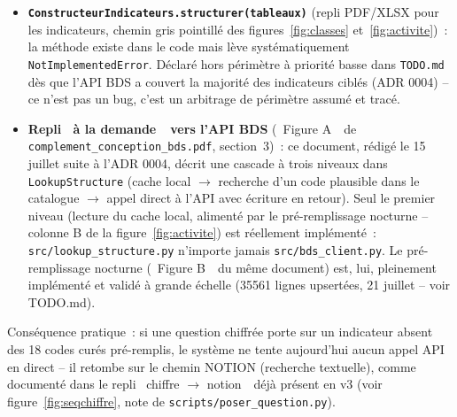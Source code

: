 \documentclass[11pt,a4paper]{article}
\begin{document}
\begin{itemize}
\item \textbf{\texttt{ConstructeurIndicateurs.structurer(tableaux)}} (repli PDF/XLSX pour les indicateurs, chemin gris pointill\'e des figures~\ref{fig:classes} et~\ref{fig:activite})~: la m\'ethode existe dans le code mais l\`eve syst\'ematiquement \texttt{NotImplementedError}. D\'eclar\'e hors p\'erim\`etre \`a priorit\'e basse dans \texttt{TODO.md} d\`es que l'API BDS a couvert la majorit\'e des indicateurs cibl\'es (ADR 0004) -- ce n'est pas un bug, c'est un arbitrage de p\'erim\`etre assum\'e et trac\'e.
\item \textbf{Repli \guillemotleft~\`a la demande~\guillemotright\ vers l'API BDS} (\guillemotleft~Figure A~\guillemotright\ de \texttt{complement\_conception\_bds.pdf}, section~3)~: ce document, r\'edig\'e le 15 juillet suite \`a l'ADR 0004, d\'ecrit une cascade \`a trois niveaux dans \texttt{LookupStructure} (cache local $\to$ recherche d'un code plausible dans le catalogue $\to$ appel direct \`a l'API avec \'ecriture en retour). Seul le premier niveau (lecture du cache local, aliment\'e par le pr\'e-remplissage nocturne -- colonne B de la figure~\ref{fig:activite}) est r\'eellement impl\'ement\'e~: \texttt{src/lookup\_structure.py} n'importe jamais \texttt{src/bds\_client.py}. Le pr\'e-remplissage nocturne (\guillemotleft~Figure B~\guillemotright\ du m\^eme document) est, lui, pleinement impl\'ement\'e et valid\'e \`a grande \'echelle (35561 lignes upsert\'ees, 21 juillet -- voir TODO.md).
\end{itemize}

Cons\'equence pratique~: si une question chiffr\'ee porte sur un indicateur absent des 18 codes cur\'es pr\'e-remplis, le syst\`eme ne tente aujourd'hui aucun appel API en direct -- il retombe sur le chemin NOTION (recherche textuelle), comme document\'e dans le repli \guillemotleft~chiffre $\to$ notion~\guillemotright\ d\'ej\`a pr\'esent en v3 (voir figure~\ref{fig:seqchiffre}, note de \texttt{scripts/poser\_question.py}).
\end{document}
